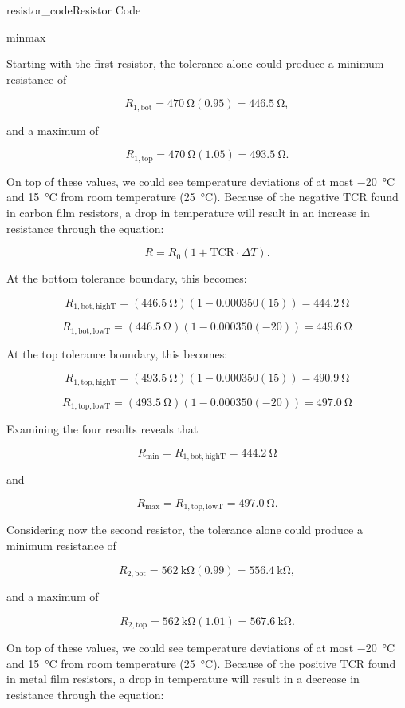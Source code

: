 \begin{mainquestion}{resistor_code}{Resistor Code}
\begin{partquestion}{minmax}
\begin{answer}
Starting with the first resistor, the tolerance alone could produce a minimum resistance of

\[
R_{1,\mathrm{bot}}
=
\qty{470}{\ohm}\left(0.95\right)
=
\qty{446.5}{\ohm},
\]

and a maximum of

\[
R_{1,\mathrm{top}}
=
\qty{470}{\ohm}\left(1.05\right)
=
\qty{493.5}{\ohm}.
\]

On top of these values, we could see temperature deviations of at most \qty{-20}{\celsius} and \qty{15}{\celsius} from room temperature (\qty{25}{\celsius}). Because of the negative TCR found in carbon film resistors, a drop in temperature will result in an increase in resistance through the equation:

\[
R=R_0\left(1+\mathrm{TCR}\cdot\Delta T\right).
\]

At the bottom tolerance boundary, this becomes:

\[
R_{1,\mathrm{bot,highT}}
=
\left(\qty{446.5}{\ohm}\right)
\left(1-0.000350\left(15\right)\right)
=
\qty{444.2}{\ohm}
\]

\[
R_{1,\mathrm{bot,lowT}}
=
\left(\qty{446.5}{\ohm}\right)
\left(1-0.000350\left(-20\right)\right)
=
\qty{449.6}{\ohm}
\]

At the top tolerance boundary, this becomes:

\[
R_{1,\mathrm{top,highT}}
=
\left(\qty{493.5}{\ohm}\right)
\left(1-0.000350\left(15\right)\right)
=
\qty{490.9}{\ohm}
\]

\[
R_{1,\mathrm{top,lowT}}
=
\left(\qty{493.5}{\ohm}\right)
\left(1-0.000350\left(-20\right)\right)
=
\qty{497.0}{\ohm}
\]

Examining the four results reveals that

\[
R_{\mathrm{min}}
=
R_{1,\mathrm{bot,highT}}
=
\qty{444.2}{\ohm}
\]

and

\[
R_{\mathrm{max}}
=
R_{1,\mathrm{top,lowT}}
=
\qty{497.0}{\ohm}.
\]

Considering now the second resistor, the tolerance alone could produce a minimum resistance of

\[
R_{2,\mathrm{bot}}
=
\qty{562}{\kilo\ohm}\left(0.99\right)
=
\qty{556.4}{\kilo\ohm},
\]

and a maximum of

\[
R_{2,\mathrm{top}}
=
\qty{562}{\kilo\ohm}\left(1.01\right)
=
\qty{567.6}{\kilo\ohm}.
\]

On top of these values, we could see temperature deviations of at most \qty{-20}{\celsius} and \qty{15}{\celsius} from room temperature (\qty{25}{\celsius}). Because of the positive TCR found in metal film resistors, a drop in temperature will result in a decrease in resistance through the equation:


\end{answer}
\end{partquestion}
\end{mainquestion}
